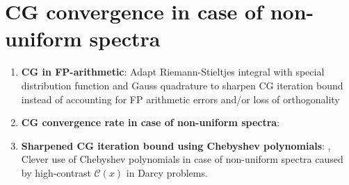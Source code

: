 \section{CG convergence in case of non-uniform spectra}\label{sec:cg_nonuniform_spectra}
\newline
\begin{enumerate}
    \item \textbf{CG in FP-arithmetic}: \cite{Meurant_Strakoš_2006} Adapt Riemann-Stieltjes integral with special distribution function and Gauss quadrature to sharpen CG iteration bound instead of accounting for FP arithmetic errors and/or loss of orthogonality
    \item \textbf{CG convergence rate in case of non-uniform spectra}: \cite{cg_convrate_Strakos1991}
    \item \textbf{Sharpened CG iteration bound using Chebyshev polynomials}: \cite{cg_sharpened_convrate_Axelsson1976}, Clever use of Chebyshev polynomials in case of non-uniform spectra caused by high-contrast $ \mathcal{C}(x) $ in Darcy problems.
\end{enumerate}